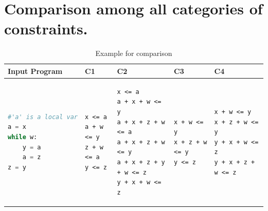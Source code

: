 \chapter{Comparison among all categories of constraints.}
\label{ch:comp}
\begin{table}
\hspace{-2cm}
\begin{tabular}{|l|l|l|l|l|}
	\hline
	Input Program  &  C1 & C2 & C3 & C4 \\
	\hline
\begin{lstlisting}[language=Python]
#'a' is a local var
a = x
while w:
	y = a
	a = z
z = y
\end{lstlisting}&
\begin{lstlisting}
x <= a
a + w <= y
z + w <= a
y <= z
\end{lstlisting}&
\begin{lstlisting}
x <= a
a + x + w <= y
a + x + z + w <= a
a + x + z + w <= y
a + x + z + y + w <= z
y + x + w <= z
\end{lstlisting}&
\begin{lstlisting}
x + w <= y
x + z + w <= y
y <= z	
\end{lstlisting}&
\begin{lstlisting}
x + w <= y
x + z + w <= y
y + x + w <= z
y + x + z + w <= z	
\end{lstlisting}\\
	\hline
	
\end{tabular}
\caption{Example for comparison}
\label{tbl:compex}
\end{table}


